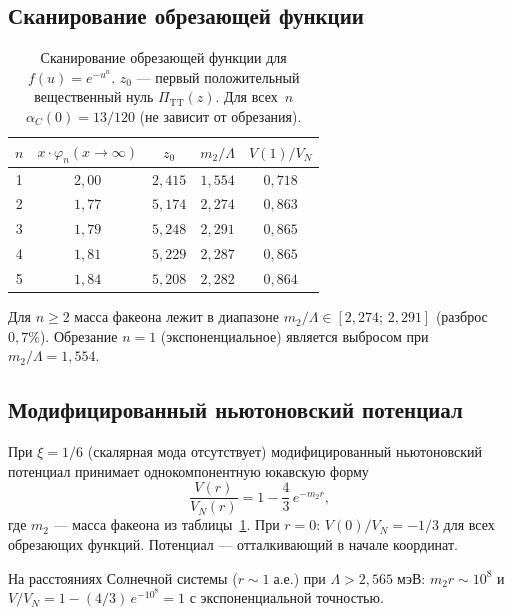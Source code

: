 \documentclass[12pt,a4paper]{article}
\theoremstyle{plain}
\theoremstyle{definition}
\theoremstyle{remark}
\begin{document}
\subsection{Сканирование обрезающей функции}
\label{sec:bands}

\begin{table}[ht]
\centering
\caption{Сканирование обрезающей функции для $f(u) = e^{-u^n}$.
$z_0$ --- первый положительный вещественный нуль
$\Pi_{\mathrm{TT}}(z)$. Для всех~$n$
$\alpha_C(0) = 13/120$ (не зависит от обрезания).}
\label{tab:bands}
\begin{tabular}{ccccc}
\toprule
$n$ & $x \cdot \varphi_n(x \to \infty)$
& $z_0$ & $m_2/\Lambda$ & $V(1)/V_N$ \\
\midrule
1 & $2{,}00$ & $2{,}415$ & $1{,}554$ & $0{,}718$ \\
2 & $1{,}77$ & $5{,}174$ & $2{,}274$ & $0{,}863$ \\
3 & $1{,}79$ & $5{,}248$ & $2{,}291$ & $0{,}865$ \\
4 & $1{,}81$ & $5{,}229$ & $2{,}287$ & $0{,}865$ \\
5 & $1{,}84$ & $5{,}208$ & $2{,}282$ & $0{,}864$ \\
\bottomrule
\end{tabular}
\end{table}

Для $n \geq 2$ масса факеона лежит в диапазоне
$m_2/\Lambda \in [2{,}274;\, 2{,}291]$ (разброс~$0{,}7\%$).
Обрезание $n = 1$ (экспоненциальное) является выбросом при
$m_2/\Lambda = 1{,}554$.

\subsection{Модифицированный ньютоновский потенциал}
\label{sec:potential}

При $\xi = 1/6$ (скалярная мода отсутствует) модифицированный
ньютоновский потенциал принимает однокомпонентную юкавскую форму
\begin{equation}\label{eq:potential}
  \frac{V(r)}{V_N(r)} = 1 - \frac{4}{3}\,e^{-m_2 r},
\end{equation}
где $m_2$ --- масса факеона из таблицы~\ref{tab:bands}.
При $r = 0$: $V(0)/V_N = -1/3$ для всех обрезающих функций.
Потенциал --- отталкивающий в начале координат.

На расстояниях Солнечной системы ($r \sim 1\;\text{а.е.}$) при
$\Lambda > 2{,}565\;\text{мэВ}$: $m_2 r \sim 10^8$ и
$V/V_N = 1 - (4/3)\,e^{-10^8} = 1$ с экспоненциальной точностью.
\end{document}
